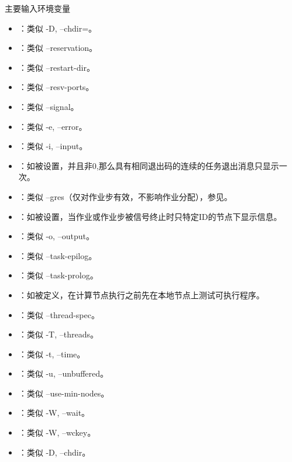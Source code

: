\begin{frame}{主要输入环境变量}
\begin{itemize}
	\item {}：类似 -D, --chdir=。
	\item {}：类似 --reservation。
	\item {}：类似 --restart-dir。
	\item {}：类似 --resv-ports。
	\item {}：类似 --signal。
	\item {}：类似 -e, --error。
	\item {}：类似 -i, --input。
	\item {}：如被设置，并且非0,那么具有相同退出码的连续的任务退出消息只显示一次。
	\item {}：类似 --gres（仅对作业步有效，不影响作业分配），参见。
	\item {}：如被设置，当作业或作业步被信号终止时只特定ID的节点下显示信息。
	\item {}：类似 -o, --output。
	\item {}：类似 --task-epilog。
	\item {}：类似 --task-prolog。
	\item {}：如被定义，在计算节点执行之前先在本地节点上测试可执行程序。
	\item {}：类似 --thread-spec。
	\item {}：类似 -T, --threads。
	\item {}：类似 -t, --time。
	\item {}：类似 -u, --unbuffered。
	\item {}：类似 --use-min-nodes。
	\item {}：类似 -W, --wait。
	\item {}：类似 -W, --wckey。
	\item {}：类似 -D, --chdir。
\end{itemize}
\end{frame}

